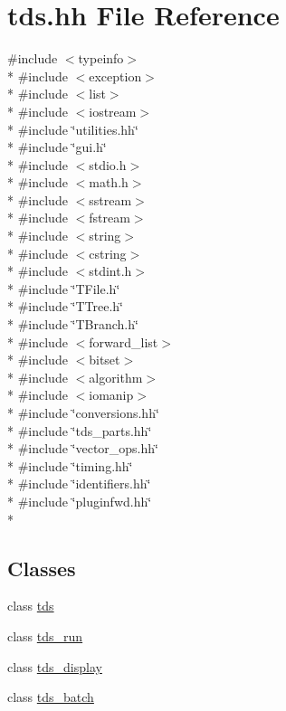 \hypertarget{tds_8hh}{}\section{tds.\+hh File Reference}
\label{tds_8hh}
{\ttfamily \#include $<$typeinfo$>$}\\*
{\ttfamily \#include $<$exception$>$}\\*
{\ttfamily \#include $<$list$>$}\\*
{\ttfamily \#include $<$iostream$>$}\\*
{\ttfamily \#include \char`\"{}utilities.\+hh\char`\"{}}\\*
{\ttfamily \#include \char`\"{}gui.\+h\char`\"{}}\\*
{\ttfamily \#include $<$stdio.\+h$>$}\\*
{\ttfamily \#include $<$math.\+h$>$}\\*
{\ttfamily \#include $<$sstream$>$}\\*
{\ttfamily \#include $<$fstream$>$}\\*
{\ttfamily \#include $<$string$>$}\\*
{\ttfamily \#include $<$cstring$>$}\\*
{\ttfamily \#include $<$stdint.\+h$>$}\\*
{\ttfamily \#include \char`\"{}T\+File.\+h\char`\"{}}\\*
{\ttfamily \#include \char`\"{}T\+Tree.\+h\char`\"{}}\\*
{\ttfamily \#include \char`\"{}T\+Branch.\+h\char`\"{}}\\*
{\ttfamily \#include $<$forward\+\_\+list$>$}\\*
{\ttfamily \#include $<$bitset$>$}\\*
{\ttfamily \#include $<$algorithm$>$}\\*
{\ttfamily \#include $<$iomanip$>$}\\*
{\ttfamily \#include \char`\"{}conversions.\+hh\char`\"{}}\\*
{\ttfamily \#include \char`\"{}tds\+\_\+parts.\+hh\char`\"{}}\\*
{\ttfamily \#include \char`\"{}vector\+\_\+ops.\+hh\char`\"{}}\\*
{\ttfamily \#include \char`\"{}timing.\+hh\char`\"{}}\\*
{\ttfamily \#include \char`\"{}identifiers.\+hh\char`\"{}}\\*
{\ttfamily \#include \char`\"{}pluginfwd.\+hh\char`\"{}}\\*
\subsection*{Classes}
\begin{DoxyCompactItemize}
\item 
class \hyperlink{classtds}{tds}
\item 
class \hyperlink{classtds__run}{tds\+\_\+run}
\item 
class \hyperlink{classtds__display}{tds\+\_\+display}
\item 
class \hyperlink{classtds__batch}{tds\+\_\+batch}
\end{DoxyCompactItemize}
